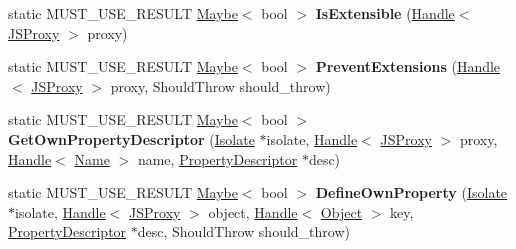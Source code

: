 \begin{DoxyCompactItemize}
\item 
static M\+U\+S\+T\+\_\+\+U\+S\+E\+\_\+\+R\+E\+S\+U\+LT \hyperlink{classv8_1_1_maybe}{Maybe}$<$ bool $>$ {\bfseries Is\+Extensible} (\hyperlink{classv8_1_1internal_1_1_handle}{Handle}$<$ \hyperlink{classv8_1_1internal_1_1_j_s_proxy}{J\+S\+Proxy} $>$ proxy)\hypertarget{classv8_1_1internal_1_1_j_s_proxy_a38d36cf93f0f09eac5f79a6019c7870a}{}\label{classv8_1_1internal_1_1_j_s_proxy_a38d36cf93f0f09eac5f79a6019c7870a}

\item 
static M\+U\+S\+T\+\_\+\+U\+S\+E\+\_\+\+R\+E\+S\+U\+LT \hyperlink{classv8_1_1_maybe}{Maybe}$<$ bool $>$ {\bfseries Prevent\+Extensions} (\hyperlink{classv8_1_1internal_1_1_handle}{Handle}$<$ \hyperlink{classv8_1_1internal_1_1_j_s_proxy}{J\+S\+Proxy} $>$ proxy, Should\+Throw should\+\_\+throw)\hypertarget{classv8_1_1internal_1_1_j_s_proxy_a547bb2191c7f7c392b30871d96ca1f53}{}\label{classv8_1_1internal_1_1_j_s_proxy_a547bb2191c7f7c392b30871d96ca1f53}

\item 
static M\+U\+S\+T\+\_\+\+U\+S\+E\+\_\+\+R\+E\+S\+U\+LT \hyperlink{classv8_1_1_maybe}{Maybe}$<$ bool $>$ {\bfseries Get\+Own\+Property\+Descriptor} (\hyperlink{classv8_1_1internal_1_1_isolate}{Isolate} $\ast$isolate, \hyperlink{classv8_1_1internal_1_1_handle}{Handle}$<$ \hyperlink{classv8_1_1internal_1_1_j_s_proxy}{J\+S\+Proxy} $>$ proxy, \hyperlink{classv8_1_1internal_1_1_handle}{Handle}$<$ \hyperlink{classv8_1_1internal_1_1_name}{Name} $>$ name, \hyperlink{classv8_1_1internal_1_1_property_descriptor}{Property\+Descriptor} $\ast$desc)\hypertarget{classv8_1_1internal_1_1_j_s_proxy_a3edc8262a2c693d07df1ee36949cb163}{}\label{classv8_1_1internal_1_1_j_s_proxy_a3edc8262a2c693d07df1ee36949cb163}

\item 
static M\+U\+S\+T\+\_\+\+U\+S\+E\+\_\+\+R\+E\+S\+U\+LT \hyperlink{classv8_1_1_maybe}{Maybe}$<$ bool $>$ {\bfseries Define\+Own\+Property} (\hyperlink{classv8_1_1internal_1_1_isolate}{Isolate} $\ast$isolate, \hyperlink{classv8_1_1internal_1_1_handle}{Handle}$<$ \hyperlink{classv8_1_1internal_1_1_j_s_proxy}{J\+S\+Proxy} $>$ object, \hyperlink{classv8_1_1internal_1_1_handle}{Handle}$<$ \hyperlink{classv8_1_1internal_1_1_object}{Object} $>$ key, \hyperlink{classv8_1_1internal_1_1_property_descriptor}{Property\+Descriptor} $\ast$desc, Should\+Throw should\+\_\+throw)\hypertarget{classv8_1_1internal_1_1_j_s_proxy_a6f47c2838c3d2e449859615805c43c33}{}\label{classv8_1_1internal_1_1_j_s_proxy_a6f47c2838c3d2e449859615805c43c33}


\end{DoxyCompactItemize}
